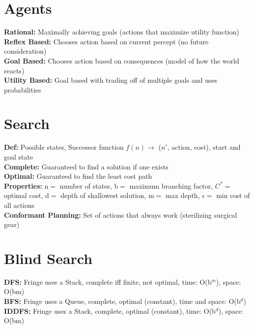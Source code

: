 \documentclass[11pt, a4paper]{article}
\begin{document}
    \begin{multicols*}{1}
        \section*{Agents}
            \textbf{Rational:} Maximally achieving goals (actions that maximize utility function) \\
            \textbf{Reflex Based:} Chooses action based on current percept (no future consideration)\\
            \textbf{Goal Based:} Chooses action based on consequences (model of how the world reacts)\\
            \textbf{Utility Based:} Goal based with trading off of multiple goals and uses probabilities
        \section*{Search}
            \textbf{Def:} Possible states, Successor function $f(n) \to$ ($n'$, action, cost), start and goal state\\
            \textbf{Complete:} Guaranteed to find a solution if one exists\\
            \textbf{Optimal:} Guaranteed to find the least cost path\\
            \textbf{Properties:} n$ =$ number of states, b$ =$ maximum branching factor, $C^*$$ =$ optimal cost, d$ =$ depth of shallowest solution, m$ =$ max depth, $\epsilon =$ min cost of all actions\\
            \textbf{Conformant Planning:} Set of actions that always work (sterilizing surgical gear)
        \section*{Blind Search}
            \textbf{DFS:} Fringe uses a Stack, complete iff finite, not optimal, time: O(b$^{m}$), space: O(bm)\\
            \textbf{BFS:} Fringe uses a Queue, complete, optimal (constant), time and space: O(b$^{d}$)\\
            \textbf{IDDFS:} Fringe uses a Stack, complete, optimal (constant), time: O(b$^{d}$), space: O(bm)

\end{multicols*}
\end{document}
